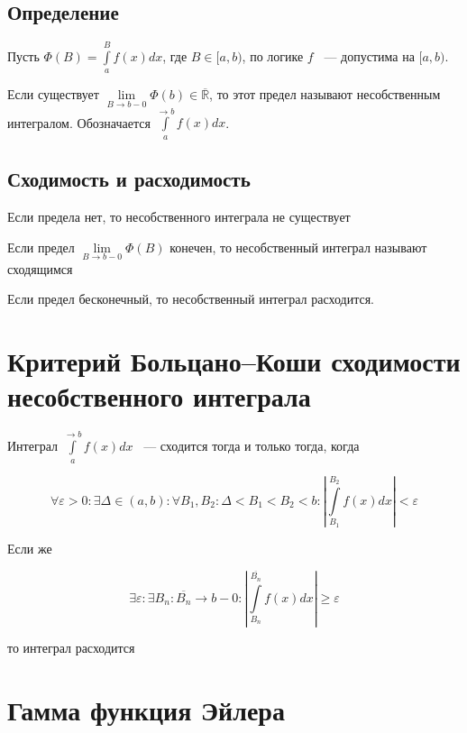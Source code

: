 \documentclass{article}
\begin{document}
        \subsection{Определение}
        
            Пусть $\Phi(B) = \int\limits^B_a f(x)dx$, где $B \in [a, b)$, по логике $f$ ~--- допустима на $[a, b)$.
            
            Если существует $\lim\limits_{B \rightarrow b - 0} \Phi(b) \in \overline{\mathbb{R}}$, то этот предел называют несобственным интегралом. Обозначается $\int\limits^{\rightarrow b}_a f(x)dx$.
            
        \subsection{Сходимость и расходимость}
        
            Если предела нет, то несобственного интеграла не существует
            
            Если предел $\lim\limits_{B \rightarrow b - 0} \Phi(B)$ конечен, то несобственный интеграл называют сходящимся
            
            Если предел бесконечный, то несобственный интеграл расходится.
            
    \newpage
    
    \section{Критерий Больцано--Коши сходимости несобственного интеграла}
    
        Интеграл $\int\limits^{\rightarrow b}_a f(x)dx$ ~--- сходится тогда и только тогда, когда
        
        $$\forall \varepsilon > 0 : \exists \Delta \in (a, b) : \forall B_1, B_2 : \Delta < B_1 < B_2 < b : \left| \int\limits^{B_2}_{B_1} f(x)dx \right| < \varepsilon$$
        
        Если же 
        
        $$\exists \varepsilon : \exists B_n : \overline{B_n} \rightarrow b - 0 : \left| \int\limits^{\overline{B_n}}_{B_n} f(x) dx \right| \geq \varepsilon$$
        
        то интеграл расходится
        
    \newpage
    
    \section{Гамма функция Эйлера}
        
\end{document}
